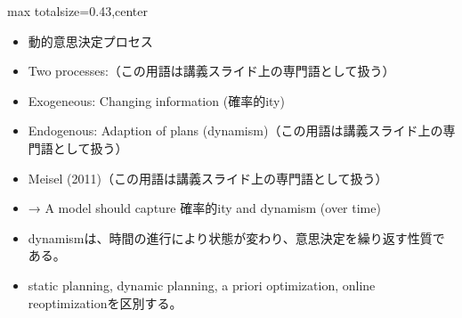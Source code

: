 \clearpage
{}
\begin{minipage}[t]{0.405\textwidth}
\begin{adjustbox}{max totalsize={\textwidth}{0.43\textheight},center}
\begin{minipage}{\textwidth}\scriptsize
{}\begin{itemize}
\item 動的意思決定プロセス
\item Two processes:（この用語は講義スライド上の専門語として扱う）
\item Exogeneous: Changing information (確率的ity)
\item Endogenous: Adaption of plans (dynamism)（この用語は講義スライド上の専門語として扱う）
\item Meisel (2011)（この用語は講義スライド上の専門語として扱う）
\item → A model should capture 確率的ity and dynamism (over time)
\end{itemize}\begin{itemize}
\item dynamismは、時間の進行により状態が変わり、意思決定を繰り返す性質である。
\item static planning, dynamic planning, a priori optimization, online reoptimizationを区別する。
\end{itemize}
\end{minipage}
\end{adjustbox}
\end{minipage}\hfill
